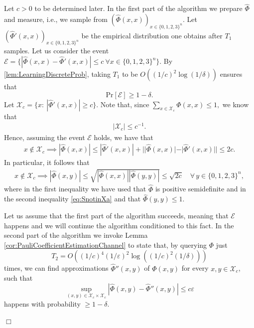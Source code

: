 \documentclass[11pt]{article}
\newcommand{\eps}{\varepsilon}
\theoremstyle{plain}
\theoremstyle{plain}
\theoremstyle{definition}
\theoremstyle{remark}
\renewenvironment{proof}[1][]{
    \begin{trivlist}
    \item[\hspace{\labelsep}{\em\noindent Proof#1:\/}]}
    {{\hfill$\Box$}
    \end{trivlist}
}
\theoremstyle{named}
\begin{document}
\begin{proof}
        Let $c>0$ to be determined later. In the first part of the algorithm we prepare $\widehat\Phi$ and measure, i.e., we sample from $(\widehat\Phi(x,x))_{x\in \{0,1,2,3\}^n}$. Let $(\widehat\Phi'(x,x))_{x\in \{0,1,2,3\}^n}$ be the empirical distribution one obtains after $T_1$ samples. Let us consider the event  $\mathcal{E}=\{|\widehat\Phi(x,x)-\widehat\Phi'(x,x)|\leq c\ \forall x\in \{0,1,2,3\}^n\}$. By \cref{lem:LearningDiscreteProb}, taking $T_1$ to be  $O((1/c)^2\log(1/\delta))$  ensures that 
\begin{equation*}
	\mathrm{Pr}[\mathcal{E}]\geq 1- \delta.
\end{equation*}
Let $\mathcal{X}_c=\{x:\ |\widehat \Phi'(x,x)|\geq c\}$. Note that, since $\sum_{x\in \mathcal{X}_c}\Phi(x,x)\leq 1,$ we know that 
\begin{align}
    |\mathcal{X}_c|\leq c^{-1}\label{eq:UpperBoundOnXa}.
\end{align}
Hence, assuming the event $\mathcal{E}$ holds, we have that
\begin{align}
    x\notin\mathcal{X}_c\implies |\widehat{\Phi}(x,x)|\leq |\widehat\Phi'(x,x)|+||\widehat \Phi(x,x)|-|\widehat\Phi'(x,x)||\leq 2c\label{eq:SnotinXa}.
\end{align}
In particular, it follows that 
\begin{align}\label{eq:SnotinXa2}
    x\notin\mathcal{X}_c\implies |\widehat{\Phi}(x,y)|\leq \sqrt{|\widehat{\Phi}(x,x)||\widehat{\Phi}(y,y)|}\leq \sqrt{2c}\quad \forall\, y\in\{0,1,2,3\}^n,
\end{align}
where in the first inequality we have used that $\widehat\Phi$ is positive semidefinite and in the second inequality \cref{eq:SnotinXa} and that $\widehat\Phi(y,y)\leq 1.$

Let us assume that the first part of the algorithm succeeds, meaning that $\mathcal{E}$ happens and we will continue the algorithm conditioned to this fact. In the second part of the algorithm we invoke  Lemma \ref{cor:PauliCoefficientEstimationChannel} to state that, by querying $\Phi$ just $$T_2=O((1/c)^4(1/\eps)^{2}\log((1/c)^{2}(1/\delta)))$$ times, we can find approximations $\widehat\Phi''(x,y)$ of $\Phi(x,y)$ for every $x,y\in\mathcal{X}_c$, such that 
$$\sup_{(x,y)\in \mathcal{X}_c\times\mathcal{X}_c}|\widehat\Phi(x,y)-\widehat\Phi''(x,y)|\leq c\eps$$happens with probability $\geq 1-\delta$.


\end{proof}
\end{document}
